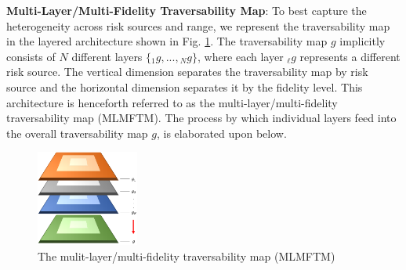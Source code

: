 \documentclass[letterpaper, 10pt, conference]{ieeeconf}      %
\newcommand{\ph}[1]{{\textbf{#1}:}} %
\newcommand{\rev}[1]{{\color{blue} #1 }} %
\begin{document}
\rev{\ph{Multi-Layer/Multi-Fidelity Traversability Map}}
To best capture the heterogeneity across risk sources and range, we represent the traversability map in the layered architecture shown in Fig. \ref{fig:layered_costmap}.
The traversability map $g$ implicitly consists of $N$ different layers \rev{$\{{}_{1}g,...,{}_{N}g\}$, where each layer ${}_{\ell}g$ represents a different risk source.}The vertical dimension separates the traversability map by risk source and the horizontal dimension separates it by the fidelity level.
This architecture is henceforth referred to as the \rev{multi-layer/multi-fidelity traversability map (MLMFTM).}
The process by which individual layers feed into the overall traversability map $g$, is elaborated upon below.
\begin{figure}[thpb]
  \centering
  \includegraphics[width=0.3\textwidth]{spot_iros/graphics/layered_costmap.png}
  \caption{The mulit-layer/multi-fidelity traversability map (MLMFTM)}
  \label{fig:layered_costmap}
\end{figure}

\end{document}
